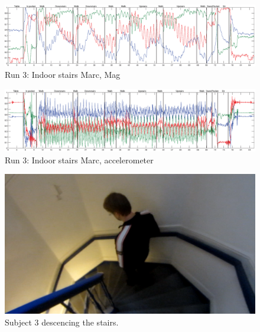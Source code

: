 \begin{figure}
\centering
  \includegraphics[width=1\textwidth]{./Figures/chapter6/data_collection/stairs-1-marc/data_plot_mag_annotated.eps}
  \caption[R3: mag]{Run 3: Indoor stairs Marc, Mag}
  \label{fig:data_gathering_run_3_mag}
\end{figure}

\begin{figure}
\centering
  \includegraphics[width=1\textwidth]{./Figures/chapter6/data_collection/stairs-1-marc/data_plot_acc_annotated.eps}
  \caption[R3: accelerometer]{Run 3: Indoor stairs Marc, accelerometer}
  \label{fig:data_gathering_run_3_acc}
\end{figure}


\begin{figure}
\centering
  \includegraphics[width=1\textwidth]{./Figures/chapter6/data_collection/stills/marc_downstairs.png}
  \caption[Recording still 8]{Subject 3 descencing the stairs.}
  \label{fig:data_gathering_still_3_descending}
\end{figure}

